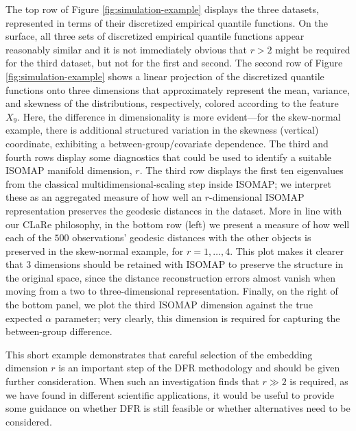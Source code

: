 The top row of Figure \ref{fig:simulation-example} displays the three datasets, represented in terms of their discretized empirical quantile functions.
On the surface, all three sets of discretized empirical quantile functions appear reasonably similar and it is not immediately obvious that $r>2$ might be required for the third dataset, but not for the first and second.
The second row of Figure \ref{fig:simulation-example} shows a linear projection of the discretized quantile functions onto three dimensions that approximately represent the mean, variance, and skewness of the distributions, respectively, colored according to the feature $X_9$.
Here, the difference in dimensionality is more evident---for the skew-normal example, there is additional structured variation in the skewness (vertical) coordinate, exhibiting a between-group/covariate dependence.
The third and fourth rows display some diagnostics that could be used to identify a suitable ISOMAP manifold dimension, $r$.
The third row displays the first ten eigenvalues from the classical multidimensional-scaling step inside ISOMAP; we interpret these as an aggregated measure of how well an $r$-dimensional ISOMAP representation preserves the geodesic distances in the dataset.
More in line with our CLaRe philosophy, in the bottom row (left) we present a measure of how well each of the $500$ observations' geodesic distances with the other objects is preserved in the skew-normal example, for $r=1, \dots, 4$. 
This plot makes it clearer that $3$ dimensions should be retained with ISOMAP to preserve the structure in the original space, since the distance reconstruction errors almost vanish when moving from a two to three-dimensional representation. 
Finally, on the right of the bottom panel, we plot the third ISOMAP dimension against the true expected $\alpha$ parameter; very clearly, this dimension is required for capturing the between-group difference.

This short example demonstrates that careful selection of the embedding dimension $r$ is an important step of the DFR methodology and should be given further consideration.
When such an investigation finds that $r \gg 2$ is required, as we have found in different scientific applications, it would be useful to provide some guidance on whether DFR is still feasible or whether alternatives need to be considered.

